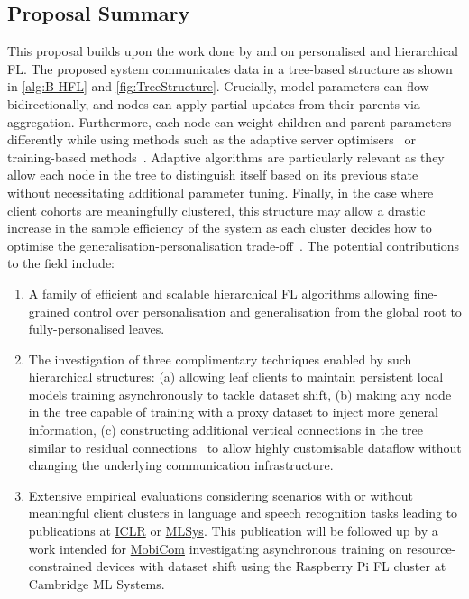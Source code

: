 \subsection{Proposal Summary}

This proposal builds upon the work done by \citet{EuroMLSysWorkshop} and \citet{OperaWorkshop} on personalised and hierarchical FL. The proposed system communicates data in a tree-based structure as shown in \cref{alg:B-HFL} and \cref{fig:TreeStructure}. Crucially, model parameters can flow bidirectionally, and nodes can apply partial updates from their parents via aggregation. Furthermore, each node can weight children and parent parameters differently while using methods such as the adaptive server optimisers~\citep{FedOPT} or training-based methods~\citep{Ditto,EWC,DeepMutualLearning,PersonalisedFLFirstOrder}. Adaptive algorithms are particularly relevant as they allow each node in the tree to distinguish itself based on its previous state without necessitating additional parameter tuning. Finally, in the case where client cohorts are meaningfully clustered, this structure may allow a drastic increase in the sample efficiency of the system as each cluster decides how to optimise the generalisation-personalisation trade-off~\citep{PersonalisationGeneralisationTradeoff}. The potential contributions to the field include:
\begin{enumerate}
    \item A family of efficient and scalable hierarchical FL algorithms allowing fine-grained control over personalisation and generalisation from the global root to fully-personalised leaves.
    \item The investigation of three complimentary techniques enabled by such hierarchical structures: (a) allowing leaf clients to maintain persistent local models training asynchronously to tackle dataset shift, (b) making any node in the tree capable of training with a proxy dataset to inject more general information, (c) constructing additional vertical connections in the tree similar to residual connections~\citep{ResNet} to allow highly customisable dataflow without changing the underlying communication infrastructure.
    \item Extensive empirical evaluations considering scenarios with or without meaningful client clusters in language and speech recognition tasks leading to publications at \href{https://iclr.cc/}{ICLR} or \href{https://mlsys.org/}{MLSys}. This publication will be followed up by a work intended for \href{https://sigmobile.org/mobicom/2023/}{MobiCom} investigating asynchronous training on resource-constrained devices with dataset shift using the Raspberry Pi FL cluster at Cambridge ML Systems.
\end{enumerate}









